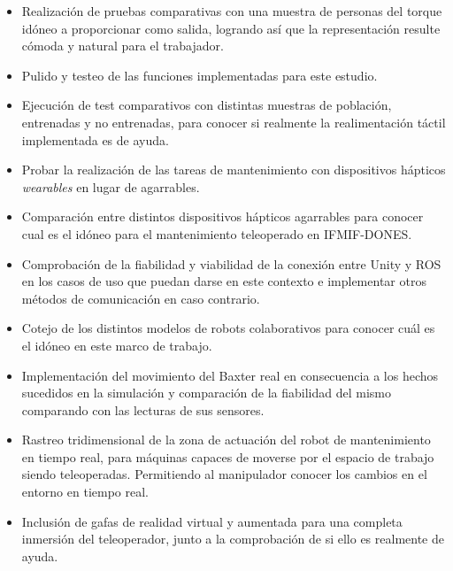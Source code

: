  \begin{itemize}
    \item Realización de pruebas comparativas con una muestra de personas del torque idóneo a proporcionar como salida, logrando así que la representación resulte cómoda y natural para el trabajador.
    
    \item Pulido y testeo de las funciones implementadas para este estudio.
     
    \item Ejecución de test comparativos con distintas muestras de población, entrenadas y no entrenadas, para conocer si realmente la realimentación táctil implementada es de ayuda.
     
    \item Probar la realización de las tareas de mantenimiento con dispositivos hápticos \textit{wearables} en lugar de agarrables.
     
    \item Comparación entre distintos dispositivos hápticos agarrables para conocer cual es el idóneo para el mantenimiento teleoperado en IFMIF-DONES.
     
    \item Comprobación de la fiabilidad y viabilidad de la conexión entre Unity y ROS en los casos de uso que puedan darse en este contexto e implementar otros métodos de comunicación en caso contrario.
     
    \item Cotejo de los distintos modelos de robots colaborativos para conocer cuál es el idóneo en este marco de trabajo.
     
    \item Implementación del movimiento del Baxter real en consecuencia a los hechos sucedidos en la simulación y comparación de la fiabilidad del mismo comparando con las lecturas de sus sensores.
     
    \item Rastreo tridimensional de la zona de actuación del robot de mantenimiento en tiempo real, para máquinas capaces de moverse por el espacio de trabajo siendo teleoperadas. Permitiendo al manipulador conocer los cambios en el entorno en tiempo real.
     
    \item Inclusión de gafas de realidad virtual y aumentada para una completa inmersión del teleoperador, junto a la comprobación de si ello es realmente de ayuda.
 \end{itemize}

\newpage\null\thispagestyle{empty}
